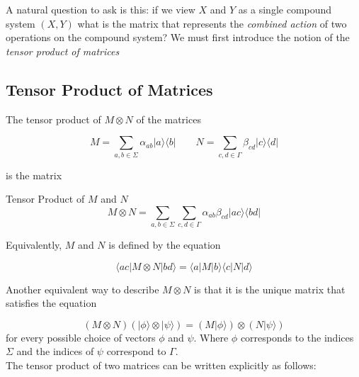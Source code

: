 \documentclass[svgnames]{article}     %
\begin{document}
A natural question to ask is this: if we view $X$ and $Y$ as a single compound
system $(X, Y)$ what is the matrix that represents the \textit{combined action}
of two operations on the compound system? We must first introduce the notion of
the \textit{tensor product of matrices}

\subsection{Tensor Product of Matrices} 

The tensor product of $M \otimes N$ of the matrices 

\[
  M = \sum_{a, b \in \Sigma} \alpha_{ab} |a\rangle \langle b | \qquad
  N = \sum_{c,d \in \Gamma} \beta_{cd} |c\rangle \langle d | 
\] \vspace{5px}


is the matrix

\begin{mainbox}{Tensor Product of $M$ and $N$}
\[
  M\otimes N = \sum_{a,b \in \Sigma} \sum_{c, d \in \Gamma}
  \alpha_{ab}\beta_{cd} |ac\rangle \langle bd | 
\] 
\end{mainbox}

Equivalently, $M$ and $N$ is defined by the equation 

\[
\langle ac | M \otimes N |bd\rangle  = \langle a | M |b\rangle \langle c | N|d\rangle 
\] \vspace{5px}

Another equivalent way to describe $M\otimes N$ is that it is the unique matrix
that satisfies the equation 

\[
  (M\otimes N) (|\phi\rangle \otimes |\psi\rangle ) = (M|\phi\rangle )\otimes
  (N|\psi\rangle )
\] \vspace{5px}
for every possible choice of vectors $\phi$ and $\psi$. Where $\phi$
corresponds to the indices $\Sigma$ and the indices of $\psi$ correspond to
$\Gamma$. \\

The tensor product of two matrices can be written explicitly as follows: 
\end{document}
